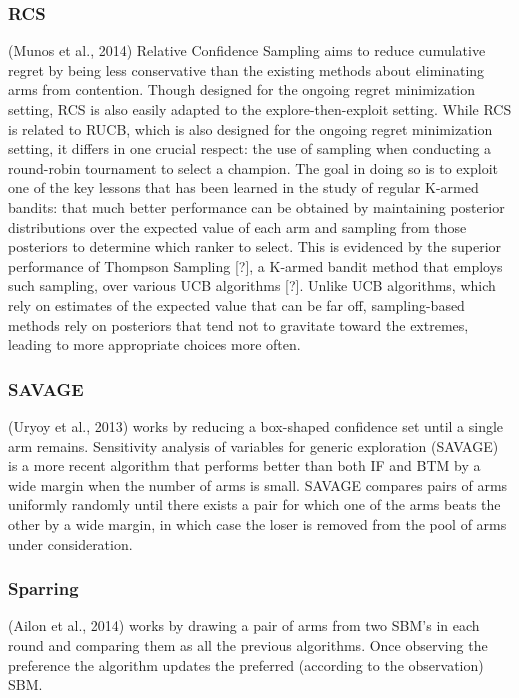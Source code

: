 \documentclass{llncs}
\begin{document}
\subsubsection{RCS}
	(Munos et al., 2014) Relative Confidence Sampling aims to reduce cumulative regret by being less conservative than the existing methods about eliminating arms from contention. 
	Though designed for the ongoing regret minimization setting, RCS is also easily adapted to the explore-then-exploit setting. 
	While RCS is related to RUCB, which is also designed for the ongoing regret minimization setting, it differs in one crucial respect: the use of sampling when conducting a round-robin tournament to select a champion.
	The goal in doing so is to exploit one of the key lessons that has been learned in the study of regular K-armed bandits: that much better performance can be obtained by maintaining posterior distributions over the expected value of each arm and sampling from those posteriors to determine which ranker to select. 
	This is evidenced by the superior performance of Thompson Sampling [?], a K-armed bandit method that employs such sampling, over various UCB algorithms [?]. 
	Unlike UCB algorithms, which rely on estimates of the expected value that can be far off, sampling-based methods rely on posteriors that tend not to gravitate toward the extremes, leading to more appropriate choices more often.

	
	
\subsubsection{SAVAGE}
	(Uryoy et al., 2013) works by reducing a box-shaped confidence set until a single arm remains.
	Sensitivity analysis of variables for generic exploration (SAVAGE) is a more recent algorithm that performs better than both IF and BTM by a wide margin when the number of arms is small. 
	SAVAGE compares pairs of arms uniformly randomly until
there exists a pair for which one of the arms beats the other by
a wide margin, in which case the loser is removed from the pool of arms under consideration.


\subsubsection{Sparring}
	(Ailon et al., 2014) works by drawing a pair of arms from two SBM's in each round and comparing them as all the previous algorithms. Once observing the preference the algorithm updates the preferred (according to the observation) SBM.  
	
\end{document}
